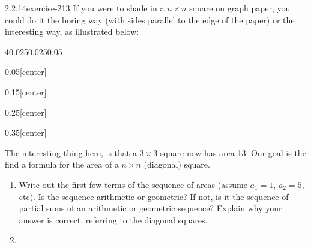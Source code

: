 \documentclass[twoside,11pt,]{book}
\numberwithin{equation}{chapter}
\begin{document}
\begin{divisionsolution}{2.2.14}{}{exercise-213}%
\hypertarget{p-3271}{}%
If you were to shade in a \(n\times n\) square on graph paper, you could do it the boring way (with sides parallel to the edge of the paper) or the interesting way, as illustrated below:%
\begin{sidebyside}{4}{0.025}{0.025}{0.05}%
\begin{sbspanel}{0.05}[center]%
\end{sbspanel}%
\begin{sbspanel}{0.15}[center]%
\end{sbspanel}%
\begin{sbspanel}{0.25}[center]%
\end{sbspanel}%
\begin{sbspanel}{0.35}[center]%
\end{sbspanel}%
\end{sidebyside}%
\par
\hypertarget{p-3272}{}%
The interesting thing here, is that a \(3\times 3\) square now has area 13. Our goal is the find a formula for the area of a \(n \times n\) (diagonal) square.\leavevmode%
\begin{enumerate}[label=(\alph*)]
\item\hypertarget{li-1910}{}\hypertarget{p-3273}{}%
Write out the first few terms of the sequence of areas (assume \(a_1 = 1\), \(a_2 = 5\), etc). Is the sequence arithmetic or geometric? If not, is it the sequence of partial sums of an arithmetic or geometric sequence? Explain why your answer is correct, referring to the diagonal squares.%
\item\hypertarget{li-1911}{}\hypertarget{p-3274}{}%

\end{enumerate}
\end{divisionsolution}
\end{document}
